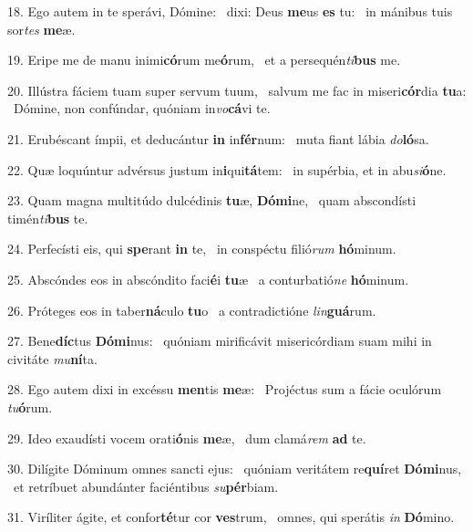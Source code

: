 18. Ego autem in te sperávi, Dómine: \dag\  dixi: Deus \textbf{me}us \textbf{es} tu: \ast\  in mánibus tuis sor\textit{tes} \textbf{me}æ.\

19. Eripe me de manu inimi\textbf{có}rum me\textbf{ó}rum, \ast\  et a persequén\textit{ti}\textbf{bus} me.\

20. Illústra fáciem tuam super servum tuum, \dag\  salvum me fac in miseri\textbf{cór}dia \textbf{tu}a: \ast\  Dómine, non confúndar, quóniam in\textit{vo}\textbf{cá}vi te.\

21. Erubéscant ímpii, et deducántur \textbf{in} in\textbf{fér}num: \ast\  muta fiant lábia \textit{do}\textbf{ló}sa.\

22. Quæ loquúntur advérsus justum in\textbf{i}qui\textbf{tá}tem: \ast\  in supérbia, et in abu\textit{si}\textbf{ó}ne.\

23. Quam magna multitúdo dulcédinis \textbf{tu}æ, \textbf{Dó}\textbf{mi}ne, \ast\  quam abscondísti timén\textit{ti}\textbf{bus} te.\

24. Perfecísti eis, qui \textbf{spe}rant \textbf{in} te, \ast\  in conspéctu filió\textit{rum} \textbf{hó}minum.\

25. Abscóndes eos in abscóndito faci\textbf{é}i \textbf{tu}æ \ast\  a conturbatió\textit{ne} \textbf{hó}minum.\

26. Próteges eos in taber\textbf{ná}culo \textbf{tu}o \ast\  a contradictióne \textit{lin}\textbf{guá}rum.\

27. Bene\textbf{díc}tus \textbf{Dó}\textbf{mi}nus: \ast\  quóniam mirificávit misericórdiam suam mihi in civitáte \textit{mu}\textbf{ní}ta.\

28. Ego autem dixi in excéssu \textbf{men}tis \textbf{me}æ: \ast\  Projéctus sum a fácie oculórum \textit{tu}\textbf{ó}rum.\

29. Ideo exaudísti vocem orati\textbf{ó}nis \textbf{me}æ, \ast\  dum clamá\textit{rem} \textbf{ad} te.\

30. Dilígite Dóminum omnes sancti ejus: \dag\  quóniam veritátem re\textbf{quí}ret \textbf{Dó}\textbf{mi}nus, \ast\  et retríbuet abundánter faciéntibus \textit{su}\textbf{pér}biam.\

31. Viríliter ágite, et confor\textbf{té}tur cor \textbf{ves}trum, \ast\  omnes, qui sperátis \textit{in} \textbf{Dó}mino.\

